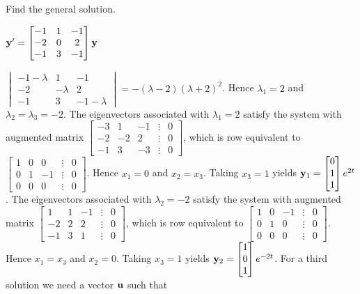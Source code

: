\documentclass{ximera}
\begin{document}
 \begin{problem}\label{exer:10.5.10} 
 Find the general solution.
 
 $ {\bf y}'
= \begin{bmatrix}-1&1&-1\\-2&0&2\\-1&3&-1\end{bmatrix}{\bf y}$

\begin{solution}
    $ \begin{vmatrix}-1-\lambda&1&-1\\-2&-\lambda&2\\-1&3&-1-\lambda\end{vmatrix}
=-(\lambda-2)(\lambda+2)^2$.
Hence $\lambda_1=2$ and  $\lambda_2=\lambda_3=-2$.
The eigenvectors associated
 with $\lambda_1=2$ satisfy the system with  augmented matrix
$  \begin{bmatrix}-3&1&-1&\vdots&0\\-2&-2&2&
\vdots&0\\-1&3&-3&\vdots&0 \end{bmatrix}$,
which is row equivalent to
$  \begin{bmatrix}1&0&0&\vdots&0\\0&1&-1&
\vdots&0\\0&0&0&\vdots&0 \end{bmatrix}$.
Hence  $x_1=0$ and $x_2=x_3$.  Taking $x_3=1$
yields
${\bf y}_1=  \begin{bmatrix}0\\1\\1\end{bmatrix}e^{2t}$.
The eigenvectors associated
 with $\lambda_2=-2$ satisfy the system with  augmented matrix
$  \begin{bmatrix}1&1&-1&\vdots&0\\-2&2&2&
\vdots&0\\-1&3&1&\vdots&0 \end{bmatrix}$,
which is row equivalent to
$  \begin{bmatrix}1&0&-1&\vdots&0\\0&1&0&
\vdots&0\\0&0&0&\vdots&0 \end{bmatrix}$.
Hence  $x_1=x_3$ and $x_2=0$.  Taking $x_3=1$
yields
${\bf y}_2=  \begin{bmatrix}1\\0\\1\end{bmatrix}e^{-2t}$.
For a third solution we need a vector ${\bf u}$ such that

\end{solution}
\end{problem}
\end{document}

